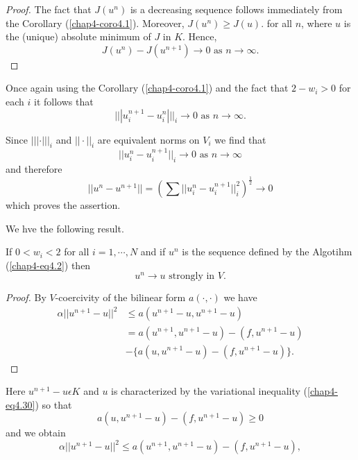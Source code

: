 \begin{proof}
The fact that $J(u^{n})$ is a decreasing sequence follows immediately from the Corollary (\ref{chap4-coro4.1}). Moreover, $J(u^{n}) \geq J(u)$. for all $n$, where $u$ is the (unique) absolute minimum of $J$ in $K$. Hence,
$$
J(u^{n}) - J(u^{n+1}) \to 0 \text{ as } n \to \infty.
$$
\end{proof}

Once again using the Corollary (\ref{chap4-coro4.1}) and the fact that $2 - w_{i} > 0$ for each $i$ it follows that
$$
||| u_{i}^{n+1} - u_{i}^{n} |||_{i} \to 0 \text{ as } n \to \infty.
$$\pageoriginale

Since $||| \cdot |||_{i}$ and $|| \cdot ||_{i}$ are equivalent norms on $V_{i}$ we find that
$$
||u_{i}^{n} - u_{i}^{n+1}||_{i} \to 0 \text{ as } n \to \infty
$$
and therefore
$$
|| u^{n} - u^{n+1} || = \left(\sum ||u_{i}^{n} - u_{i}^{n+1}||_{i}^{2} \right)^{\frac{1}{2}} \to 0
$$
which proves the assertion.

\medskip
{} We hve the following result.

\begin{theorem}\label{chap4-thm4.4}
If $0 < w_{i} < 2$ for all $i = 1, \cdots, N$ and if $u^{n}$ is the sequence defined by the Algotihm (\ref{chap4-eq4.2}) then
\begin{equation*}
u^{n} \to u \text{ strongly in } V.\tag{4.58}\label{chap4-eq4.58}
\end{equation*}
\end{theorem}

\begin{proof}
By $V$-coercivity of the bilinear form $a(\cdot , \cdot)$ we have
\begin{align*}
\alpha || u^{n+1} - u ||^{2} & \leq a(u^{n+1} - u, u^{n+1} - u)\\
&  = a(u^{n+1}, u^{n+1}-u) - (f, u^{n+1} - u)\\
& - \{a(u, u^{n+1} - u) - (f, u^{n+1} - u)\}.
\end{align*}
\end{proof}

Here $u^{n+1} - u \epsilon K$ and $u$ is characterized by the variational inequality (\ref{chap4-eq4.30}) so that
$$
a(u, u^{n+1}-u) - (f, u^{n+1}-u) \geq 0
$$
and we obtain
\begin{equation*}
\alpha||u^{n+1} - u||^{2} \leq a(u^{n+1}, u^{n+1}-u) - (f, u^{n+1}-u),\tag{4.59} \label{chap4-eq4.59}
\end{equation*}

